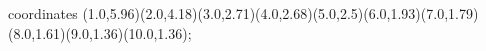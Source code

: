 					coordinates { (1.0,5.96)(2.0,4.18)(3.0,2.71)(4.0,2.68)(5.0,2.5)(6.0,1.93)(7.0,1.79)(8.0,1.61)(9.0,1.36)(10.0,1.36)};